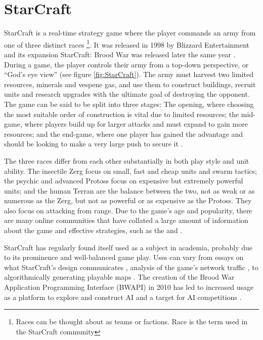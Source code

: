 \documentclass[11pt,openright,a4paper]{report}
\begin{document}
\section{StarCraft}
StarCraft is a real-time strategy game where the player commands an army from one of three distinct races \footnote{Races can be thought about as teams or factions. Race is the term used in the StarCraft community}. It was released in 1998 by Blizzard Entertainment and its expansion StarCraft: Brood War was released later the same year \cite{Blizzard}. During a game, the player controls their army from a top-down perspective, or ``God's eye view'' (see figure \ref{fig:StarCraft}). The army must harvest two limited resources, minerals and vespene gas, and use them to construct buildings, recruit units and research upgrades with the ultimate goal of destroying the opponent. The game can be said to be split into three stages: The opening, where choosing the most suitable order of construction is vital due to limited resources; the mid-game, where players build up for larger attacks and must expand to gain more resources; and the end-game, where one player has gained the advantage and should be looking to make a very large push to secure it \cite{yi2011adaptive}.

The three races differ from each other substantially in both play style and unit ability. The insectile Zerg focus on small, fast and cheap units and swarm tactics; the psychic and advanced Protoss focus on expensive but extremely powerful units; and the human Terran are the balance between the two, not as weak or as numerous as the Zerg, but not as powerful or as expensive as the Protoss. They also focus on attacking from range.  Due to the game's age and popularity, there are many online communities that have collated a large amount of information about the game and effective strategies, such as the  and .

StarCraft has regularly found itself used as a subject in academia, probably due to its prominence and well-balanced game play.  Uses can vary from essays on what StarCraft's design communicates \cite{galloway2007starcraft}, analysis of the game's network traffic \cite{dainotti2005packet} , to algorithmically generating playable maps \cite{togelius2010multiobjective}. The creation of the Brood War Application Programming Interface (BWAPI) in 2010 \cite{bwapiMain} has led to increased usage as a platform to explore and construct AI and a target for AI competitions \cite{bwapiCompetitions}.
\end{document}
